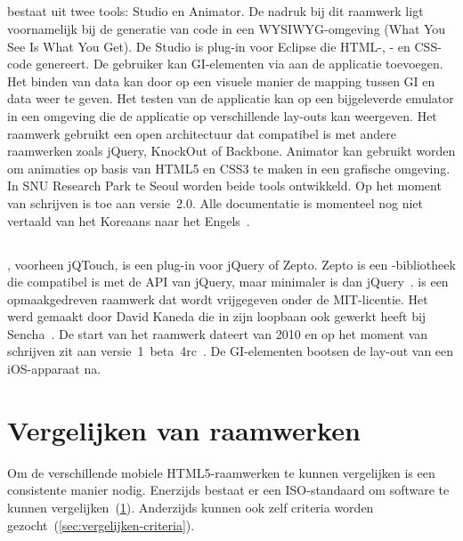 \subsection{\davinci}%
\davinci{} bestaat uit twee tools:  \davinci{} Studio en \davinci{} Animator.
De nadruk bij dit raamwerk ligt voornamelijk bij de generatie van code in een WYSIWYG-omgeving (What You See Is What You Get).
De \davinci{} Studio is plug-in voor Eclipse die HTML-,  \js{}- en CSS-code genereert.
De gebruiker kan GI-elementen via  aan de applicatie toevoegen.
Het binden van data kan door op een visuele manier de mapping tussen GI en data weer te geven.
Het testen van de applicatie kan op een bijgeleverde emulator in een  omgeving die de applicatie op verschillende lay-outs kan weergeven.
Het raamwerk gebruikt een open architectuur dat compatibel is met andere  raamwerken zoals jQuery, KnockOut of Backbone.
\davinci{} Animator kan gebruikt worden om animaties op basis van HTML5 en CSS3 te maken in een grafische omgeving.
In SNU Research Park te Seoul worden beide tools ontwikkeld.
Op het moment van schrijven is \davinci{} toe aan versie~2.0.  
Alle documentatie is momenteel nog niet vertaald van het Koreaans naar het Engels~\cite{Incross}.


\subsection{\jqt}%
\jqt{}, voorheen jQTouch, is een plug-in voor jQuery of Zepto.
Zepto is een \js{}-bibliotheek die compatibel is met de API van jQuery, maar minimaler is dan jQuery~\cite{Zepto2013}.
\jqt{} is een opmaakgedreven raamwerk dat wordt vrijgegeven onder de MIT-licentie.
Het werd gemaakt door David Kaneda die in zijn loopbaan ook gewerkt heeft bij Sencha~\cite{JQT2013,Kaneda2013}.
De start van het raamwerk dateert van 2010 en op het moment van schrijven zit \jqt{} aan versie~1~beta~4rc~\cite{JQTouch2010,JQT2013}.
De GI-elementen bootsen de lay-out van een iOS-apparaat na.

 


\section{Vergelijken van raamwerken} 
\label{sec:vergelijken-raamwerken}
Om de verschillende mobiele HTML5-raamwerken te kunnen vergelijken is een consistente manier nodig.
Enerzijds bestaat er een ISO-standaard om software te kunnen vergelijken~(\ref{sec:vergelijken-raamwerken}).
Anderzijds kunnen ook zelf criteria worden gezocht~(\ref{sec:vergelijken-criteria}).

